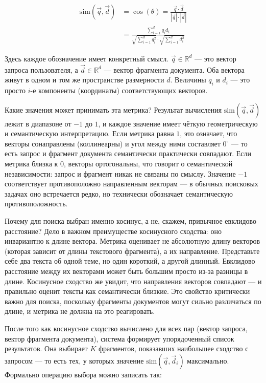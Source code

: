 \begin{equation}
\begin{aligned}
\text{sim}(\vec{q}, \vec{d}) &= \cos(\theta) = \frac{\vec{q} \cdot \vec{d}}{|\vec{q}| \cdot |\vec{d}|} \\
&= \frac{\displaystyle\sum_{i=1}^{d} q_i d_i}{\displaystyle\sqrt{\sum_{i=1}^{d} q_i^2} \cdot \sqrt{\sum_{i=1}^{d} d_i^2}}
\end{aligned}
\end{equation}

Здесь каждое обозначение имеет конкретный смысл. $\vec{q} \in \mathbb{R}^d$ — это вектор запроса пользователя, а $\vec{d} \in \mathbb{R}^d$ — вектор фрагмента документа. Оба вектора живут в одном и том же пространстве размерности $d$. Величины $q_i$ и $d_i$ — это просто $i$-е компоненты (координаты) соответствующих векторов.

Какие значения может принимать эта метрика? Результат вычисления $\text{sim}(\vec{q}, \vec{d})$ лежит в диапазоне от $-1$ до $1$, и каждое значение имеет чёткую геометрическую и семантическую интерпретацию. Если метрика равна $1$, это означает, что векторы сонаправлены (коллинеарны) и угол между ними составляет $0^\circ$ — то есть запрос и фрагмент документа семантически практически совпадают. Если метрика близка к $0$, векторы ортогональны, что говорит о семантической независимости: запрос и фрагмент никак не связаны по смыслу. Значение $-1$ соответствует противоположно направленным векторам — в обычных поисковых задачах оно встречается редко, но технически обозначает семантическую противоположность.

Почему для поиска выбран именно косинус, а не, скажем, привычное евклидово расстояние? Дело в важном преимуществе косинусного сходства: оно инвариантно к длине вектора. Метрика оценивает не абсолютную длину векторов (которая зависит от длины текстового фрагмента), а их направление. Представьте себе два текста об одной теме, но один короткий, а другой длинный. Евклидово расстояние между их векторами может быть большим просто из-за разницы в длине. Косинусное сходство же увидит, что направления векторов совпадают — и правильно оценит тексты как семантически близкие. Это свойство критически важно для поиска, поскольку фрагменты документов могут сильно различаться по длине, и метрика не должна на это реагировать.

После того как косинусное сходство вычислено для всех пар (вектор запроса, вектор фрагмента документа), система формирует упорядоченный список результатов. Она выбирает $K$ фрагментов, показавших наибольшее сходство с запросом — то есть тех, у которых значение $\text{sim}(\vec{q}, \vec{d}_i)$ максимально. Формально операцию выбора можно записать так:

